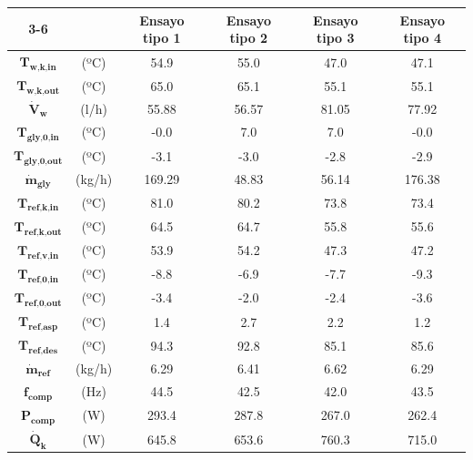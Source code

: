 \documentclass[../main.tex]{subfiles}
\begin{document}
\begin{table}[ht]
\centering
\begin{tabular}{cc|c|c|c|c|}
\cline{3-6}
 & & \textbf{Ensayo tipo 1} & \textbf{Ensayo tipo 2} & \textbf{Ensayo tipo 3} & \textbf{Ensayo tipo 4} \\
\hline
\multicolumn{1}{|c}{$\textbf{T}_\textbf{w,k,in}$} & (ºC) & 54.9 & 55.0 & 47.0 & 47.1 \\
\hline
\multicolumn{1}{|c}{$\textbf{T}_\textbf{w,k,out}$} & (ºC) & 65.0 & 65.1 & 55.1 & 55.1 \\
\hline
\multicolumn{1}{|c}{$\dot{\textbf{V}}_\textbf{w}$} & (l/h) & 55.88 & 56.57 & 81.05 & 77.92 \\
\hline
\multicolumn{1}{|c}{$\textbf{T}_\textbf{gly,0,in}$} & (ºC) & -0.0 & 7.0 & 7.0 & -0.0 \\
\hline
\multicolumn{1}{|c}{$\textbf{T}_\textbf{gly,0,out}$} & (ºC) & -3.1 & -3.0 & -2.8 & -2.9 \\
\hline
\multicolumn{1}{|c}{$\dot{\textbf{m}}_\textbf{gly}$} & (kg/h) & 169.29 & 48.83 & 56.14 & 176.38 \\
\hline
\multicolumn{1}{|c}{$\textbf{T}_\textbf{ref,k,in}$} & (ºC) & 81.0 & 80.2 & 73.8 & 73.4 \\
\hline
\multicolumn{1}{|c}{$\textbf{T}_\textbf{ref,k,out}$} & (ºC) & 64.5 & 64.7 & 55.8 & 55.6 \\
\hline
\multicolumn{1}{|c}{$\textbf{T}_\textbf{ref,v,in}$} & (ºC) & 53.9 & 54.2 & 47.3 & 47.2 \\
\hline
\multicolumn{1}{|c}{$\textbf{T}_\textbf{ref,0,in}$} & (ºC) & -8.8 & -6.9 & -7.7 & -9.3 \\
\hline
\multicolumn{1}{|c}{$\textbf{T}_\textbf{ref,0,out}$} & (ºC) & -3.4 & -2.0 & -2.4 & -3.6 \\
\hline
\multicolumn{1}{|c}{$\textbf{T}_\textbf{ref,asp}$} & (ºC) & 1.4 & 2.7 & 2.2 & 1.2 \\
\hline
\multicolumn{1}{|c}{$\textbf{T}_\textbf{ref,des}$} & (ºC) & 94.3 & 92.8 & 85.1 & 85.6 \\
\hline
\multicolumn{1}{|c}{$\dot{\textbf{m}}_\textbf{ref}$} & (kg/h) & 6.29 & 6.41 & 6.62 & 6.29 \\
\hline
\multicolumn{1}{|c}{$\textbf{f}_\textbf{comp}$} & (Hz) & 44.5 & 42.5 & 42.0 & 43.5 \\
\hline
\multicolumn{1}{|c}{$\textbf{P}_\textbf{comp}$} & (W) & 293.4 & 287.8 & 267.0 & 262.4 \\
\hline
\multicolumn{1}{|c}{$\dot{\textbf{Q}}_\textbf{k}$} & (W) & 645.8 & 653.6 & 760.3 & 715.0 \\

\end{tabular}
\end{table}
\end{document}
